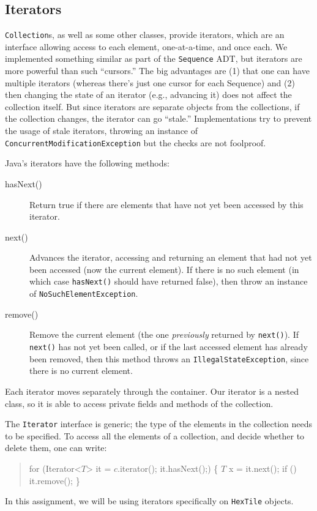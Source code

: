 \documentclass[11pt]{article}
\begin{document}
\subsection{Iterators}

\texttt{Collection}s, as well as some other classes, provide iterators, which
are an interface allowing access to each element, one-at-a-time, and once each.
We implemented something similar as part of the \texttt{Sequence} ADT,
but iterators are more powerful than such ``cursors.''
The big advantages are (1) that one can have multiple
iterators (whereas there's just one cursor for each \textsf{Sequence})
and (2) then changing the state of an iterator (e.g., advancing it) does not affect the collection itself.
But since iterators are separate objects from the collections, if the
collection changes, the iterator can go ``stale.''  Implementations
try to prevent the usage of stale iterators, throwing an instance of
\texttt{ConcurrentModificationException} but the checks are not
foolproof.  

Java's iterators have the following methods:
\begin{description}
\item[hasNext()] Return true if there are elements that have not
yet been accessed by this iterator.
\item[next()] Advances the iterator, accessing and returning
  an element that had not yet been accessed (now the current element).
  If there is no such element (in which case \verb|hasNext()| should have returned
  false), then throw an instance of \verb|NoSuchElementException|.
\item[remove()] Remove the current element (the one \emph{previously} returned by
  \verb|next()|). If \texttt{next()} has not yet been called, or if
  the last accessed element has already been removed, then this method throws an
  \texttt{IllegalStateException}, since there is no current element.
\end{description}
Each iterator moves separately through the container. Our iterator is a nested
class, so it is able to access private fields and methods of the collection.

The \verb|Iterator| interface is generic; the type of the elements
in the collection needs to be specified.
To access all the elements of a collection, and decide whether to
delete them, one can write:
\begin{quote}
\begin{program}
for (Iterator<$T$> it = $c$.iterator(); it.hasNext();) \{
   $T$ x = it.next();
   if () it.remove();
\}
\end{program}
\end{quote}
In this assignment, we will be using iterators specifically on
\texttt{HexTile} objects.
\end{document}
